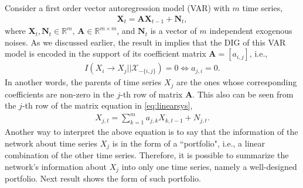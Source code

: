Consider a first order vector autoregression model (VAR) with $m$ time series, 
\begin{align}\label{eq:linearsys}
\textbf{X}_t = \textbf{AX}_{t-1} + \textbf{N}_t,
\end{align}
where $\textbf{X}_t, \textbf{N}_t\in\mathbb{R}^m$, $\textbf{A}\in\mathbb{R}^{m\times m}$, and  $\textbf{N}_t$ is a vector of $m$ independent exogenous noises.
As we discussed earlier, the result in \citet{acc2014} implies that the DIG of this VAR model is encoded in the support of its coefficient matrix $\textbf{A}=[a_{i,j}]$, i.e., 
\begin{align}
    I(X_i\rightarrow X_j|| \mathcal{X}_{-\{i,j\}})=0 \Longleftrightarrow a_{j,i}=0.
\end{align}
In another words, the parents of time series $X_j$ are the ones whose corresponding coefficients are non-zero in the $j$-th row of matrix $\textbf{A}$. 
This also can be seen from the $j$-th row of the matrix equation in \eqref{eq:linearsys},
\begin{align}\label{eq:linear_each}
    X_{j,t}=\sum_{k=1}^m a_{j,k}X_{k,t-1}+N_{j,t}.
\end{align}
Another way to interpret the above equation is to say that the information of the network about time series $X_j$ is in the form of a ``portfolio", i.e., a linear combination of the other time series. 
Therefore, it is possible to summarize the network's information about $X_j$ into only one time series, namely a well-designed portfolio. 
Next result shows the form of such portfolio. 

